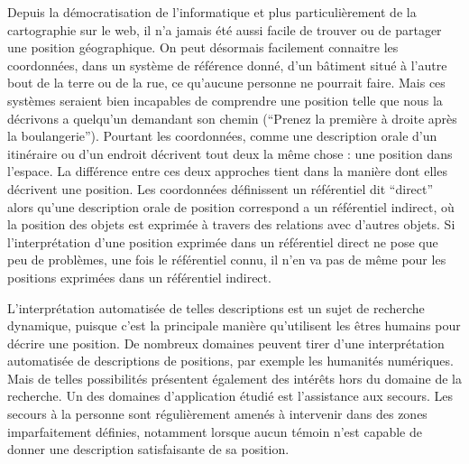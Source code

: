 
Depuis la démocratisation de l'informatique et plus particulièrement
de la cartographie sur le web, il n'a jamais été aussi facile de
trouver ou de partager une position géographique. On peut désormais
facilement connaitre les coordonnées, dans un système de référence
donné, d'un bâtiment situé à l'autre bout de la terre ou de la rue, ce
qu'aucune personne ne pourrait faire. Mais ces systèmes seraient bien
incapables de comprendre une position telle que nous la décrivons a
quelqu’un demandant son chemin (\eg \enquote{Prenez la première à
  droite après la boulangerie}). Pourtant les coordonnées, comme une
description orale d'un itinéraire ou d'un endroit décrivent tout deux
la même chose : une position dans l'espace. La différence entre ces
deux approches tient dans la manière dont elles décrivent une
position. Les coordonnées définissent un référentiel dit
\enquote{direct} alors qu'une description orale de position correspond
a un référentiel indirect, où la position des objets est exprimée à
travers des relations avec d'autres objets. Si l’interprétation d'une
position exprimée dans un référentiel direct ne pose que peu de
problèmes, une fois le référentiel connu, il n'en va pas de même pour
les positions exprimées dans un référentiel indirect.

L'interprétation automatisée de telles descriptions est un sujet de
recherche dynamique, puisque c'est la principale manière qu'utilisent
les êtres humains pour décrire une position. De nombreux domaines
peuvent tirer d'une interprétation automatisée de descriptions de
positions, par exemple les humanités numériques. Mais de telles
possibilités présentent également des intérêts hors du domaine de la
recherche. Un des domaines d’application étudié est l'assistance aux
secours. Les secours à la personne sont régulièrement amenés à
intervenir dans des zones imparfaitement définies, notamment lorsque
aucun témoin  n'est capable de donner une description satisfaisante de
sa position.








